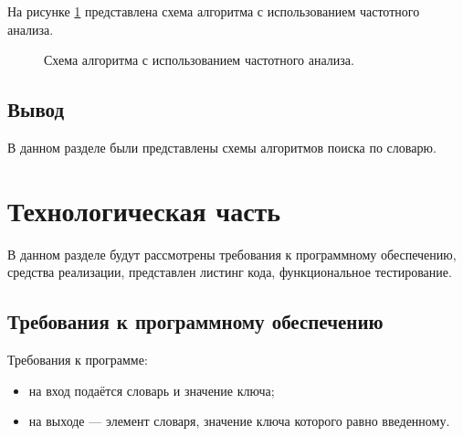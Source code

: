 \documentclass[12pt]{report}
\begin{document}
\newpage
На рисунке \ref{fig:Combi} представлена схема алгоритма с использованием частотного анализа.

\begin{figure}[H]
	\caption{Схема алгоритма с использованием частотного анализа.}
	\label{fig:Combi}
\end{figure}

\section{Вывод}
В данном разделе были представлены схемы алгоритмов поиска по словарю.


\chapter{Технологическая часть}
В данном разделе будут рассмотрены требования к программному обеспечению, средства реализации, представлен листинг кода, функциональное тестирование.

\section{Требования к программному обеспечению}
Требования к программе:

\begin{itemize}
	\item на вход подаётся словарь и значение ключа;
	\item на выходе — элемент словаря, значение ключа которого равно введенному. 
\end{itemize}
\end{document}

